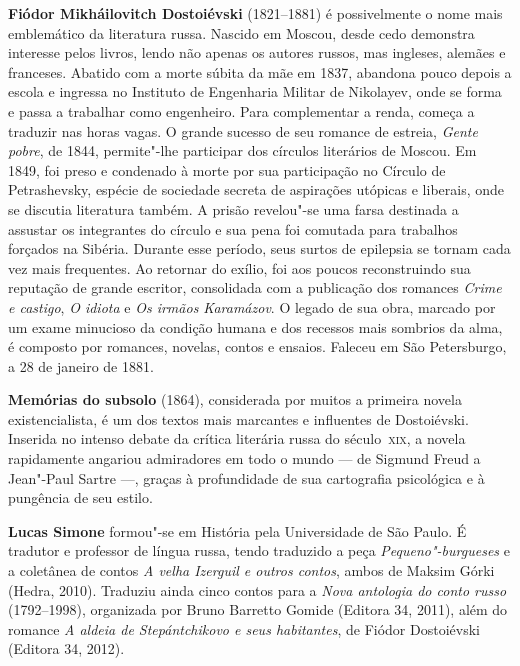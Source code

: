 \textbf{Fiódor Mikháilovitch Dostoiévski} (1821--1881) é possivelmente o nome mais emblemático
da literatura russa. Nascido em Moscou, desde cedo demonstra interesse pelos livros, lendo não apenas os autores russos,
mas ingleses, alemães e franceses. Abatido com a morte súbita da mãe em 1837, abandona pouco depois a escola e ingressa 
no Instituto de Engenharia Militar de Nikolayev, onde se forma e passa a trabalhar como engenheiro. 
Para complementar a renda, começa a traduzir nas horas vagas. O grande sucesso de seu romance de estreia, \textit{Gente pobre}, 
de 1844, permite"-lhe participar dos círculos literários de Moscou. Em 1849, foi
preso e condenado à morte por sua participação no Círculo de Petrashevsky, 
espécie de sociedade secreta de aspirações utópicas e liberais, onde se discutia literatura também. 
A prisão revelou"-se uma farsa destinada a assustar os integrantes do círculo e sua pena foi comutada para 
trabalhos forçados na Sibéria. Durante esse período, seus surtos de epilepsia se tornam cada vez mais
frequentes. Ao retornar do exílio, foi aos poucos reconstruindo sua reputação de grande escritor, consolidada com a
publicação dos romances \textit{Crime e castigo}, \textit{O idiota} e \textit{Os irmãos Karamázov}. 
O legado de sua obra, marcado por um exame minucioso da condição humana e dos recessos mais sombrios da alma,
é composto por romances, novelas, contos e ensaios. Faleceu em São Petersburgo, a 28 de janeiro de 1881.

\textbf{Memórias do subsolo} (1864), considerada por muitos a primeira
novela existencialista, é um dos textos mais marcantes e influentes de Dostoiévski. 
Inserida no intenso debate da crítica literária russa do século~\textsc{xix}, a novela 
rapidamente angariou admiradores em todo o mundo --- de Sigmund Freud a Jean"-Paul Sartre ---,
graças à profundidade de sua cartografia psicológica e à pungência de seu estilo.
        
\textbf{Lucas Simone} formou"-se em História pela
Universidade de São Paulo. É tradutor e professor de língua russa,
tendo traduzido a peça \textit{Pequeno"-burgueses} e a coletânea de contos \textit{A velha
Izerguil e outros contos}, ambos de Maksim Górki (Hedra, 2010).
Traduziu ainda cinco contos para a \textit{Nova antologia do conto
russo} (1792--1998), organizada por Bruno Barretto Gomide (Editora 34,
2011), além do romance \textit{A aldeia de Stepántchikovo e seus
habitantes}, de Fiódor Dostoiévski (Editora 34, 2012).


